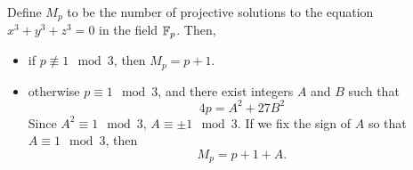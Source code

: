 %

\begin{theorem}
Define $M_p$ to be the number of projective solutions to the equation $x^3 + y^3 + z^3 = 0$ in the field $\mathbb{F}_p$.
Then,
\begin{itemize}
\item if $p \not\equiv 1 \mod{3}$, then $M_p = p + 1$.
\item otherwise $p \equiv 1 \mod{3}$, and there exist integers $A$ and $B$ such that
	$$4p = A^2 + 27B^2$$
	Since $A^2 \equiv 1 \mod{3}$, $A \equiv \pm1 \mod{3}$.
	If we fix the sign of $A$ so that $A \equiv 1 \mod{3}$, then
	$$M_p = p + 1 + A.$$
\end{itemize}
\end{theorem}

